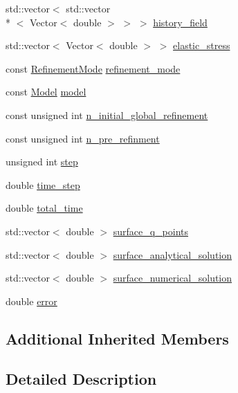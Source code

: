 \begin{DoxyCompactItemize}
\item 
std\-::vector$<$ std\-::vector\\*
$<$ Vector$<$ double $>$ $>$ $>$ \hyperlink{classvsf_1_1ApShear_a7c82ee5522aea1d617636aa1af8b3dd6}{history\-\_\-field}
\item 
std\-::vector$<$ Vector$<$ double $>$ $>$ \hyperlink{classvsf_1_1ApShear_a33a3a15c5d8d4f808dbb7e7e26154048}{elastic\-\_\-stress}
\item 
const \hyperlink{classvsf_1_1ApShear_aef8049bf5f942237a19e8b88ddc19e8c}{Refinement\-Mode} \hyperlink{classvsf_1_1ApShear_a523d3e34e242a9dbcf1d727dc17874b6}{refinement\-\_\-mode}
\item 
const \hyperlink{classvsf_1_1ApShear_a354ce33d5e60761e975bdb924119354d}{Model} \hyperlink{classvsf_1_1ApShear_a3a6fb4045df9297aea20326cb0df5748}{model}
\item 
const unsigned int \hyperlink{classvsf_1_1ApShear_ab02322073eb961685e8daef27729bf8d}{n\-\_\-initial\-\_\-global\-\_\-refinement}
\item 
const unsigned int \hyperlink{classvsf_1_1ApShear_a5c702ecbc19d28d835e666c8ee87c4eb}{n\-\_\-pre\-\_\-refinment}
\item 
unsigned int \hyperlink{classvsf_1_1ApShear_aa8a20bee076f8edea5090fe587af2630}{step}
\item 
double \hyperlink{classvsf_1_1ApShear_ab11c93d8c80fc10976c8fb91a733cf92}{time\-\_\-step}
\item 
double \hyperlink{classvsf_1_1ApShear_ab4bd5313e37b8819910d35aaae0a2373}{total\-\_\-time}
\item 
std\-::vector$<$ double $>$ \hyperlink{classvsf_1_1ApShear_a9aec407d8269d51336f50f3a9d94b53b}{surface\-\_\-q\-\_\-points}
\item 
std\-::vector$<$ double $>$ \hyperlink{classvsf_1_1ApShear_a96a76f66c7155491bfe3d3c50d576fe9}{surface\-\_\-analytical\-\_\-solution}
\item 
std\-::vector$<$ double $>$ \hyperlink{classvsf_1_1ApShear_adbc4b0f8e2a3282b27241a2088f9717d}{surface\-\_\-numerical\-\_\-solution}
\item 
double \hyperlink{classvsf_1_1ApShear_a980e61d73be5cae2b8e8498b9ffc087a}{error}
\end{DoxyCompactItemize}
\subsection*{Additional Inherited Members}


\subsection{Detailed Description}
